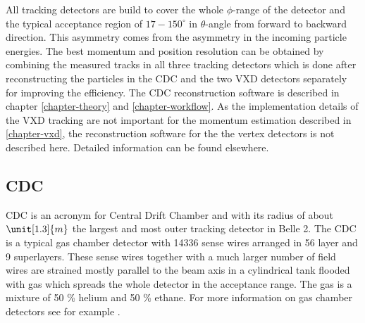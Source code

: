 All tracking detectors are build to cover the whole $\phi$-range of the detector and the typical acceptance region of $17-150 ^\circ$ in $\theta$-angle from forward to backward direction. This asymmetry comes from the asymmetry in the incoming particle energies. The best momentum and position resolution can be obtained by combining the measured tracks in all three tracking detectors which is done after reconstructing the particles in the CDC and the two VXD detectors separately for improving the efficiency. The CDC reconstruction software is described in chapter \ref{chapter-theory} and \ref{chapter-workflow}. As the implementation details of the VXD tracking are not important for the momentum estimation described in \ref{chapter-vxd}, the reconstruction software for the the vertex detectors is not described here. Detailed information can be found elsewhere. 

\subsection{CDC}

CDC is an acronym for Central Drift Chamber and with its radius of about $\unit[1.3]{m}$ the largest and most outer tracking detector in Belle 2. The CDC is a typical gas chamber detector with 14336 sense wires arranged in 56 layer and 9 superlayers. These sense wires together with a much larger number of field wires are strained mostly parallel to the beam axis in a cylindrical tank flooded with gas which spreads the whole detector in the acceptance range. The gas is a mixture of 50 \% helium and 50 \% ethane. For more information on gas chamber detectors see for example \cite{grupen}.

